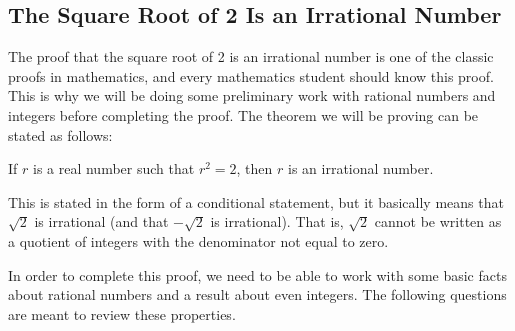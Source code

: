 \subsection*{The Square Root of 2 Is an Irrational Number}
The proof that the square root of  2 is an irrational number is one of the classic proofs in mathematics, and  every mathematics student should know this proof.  %
This is why we will be doing some preliminary work with rational numbers and integers before completing the proof.  The theorem we will be proving can be stated as follows:

\begin{list}{}
  \item If  $r$  is a real number such that  $r^2  = 2$, then  $r$  is an irrational number.
\end{list}
\newpar
This is stated in the form of a conditional statement, but it basically means that  $\sqrt 2$
 is irrational (and that   $ - \sqrt 2$ is irrational).  That is,  $\sqrt 2$  cannot be written as a quotient of integers with the denominator not equal to zero.

In order to complete this proof, we need to be able to work with some basic facts about rational numbers and a result about even integers.  The following questions are meant to review these properties.

